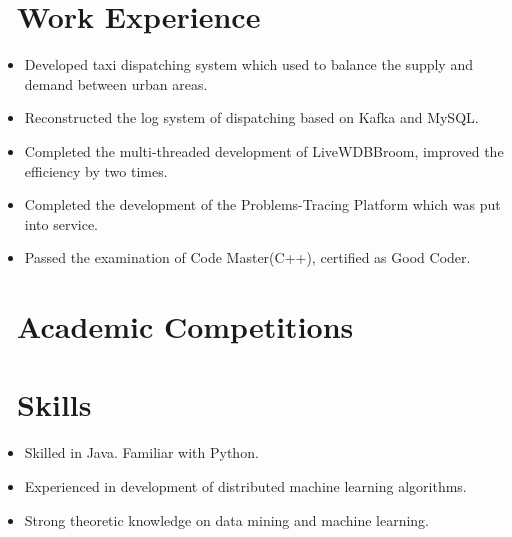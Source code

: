 \documentclass{resume}
\begin{document}
\section{\faSitemap\ Work Experience}

\begin{itemize}
  \item Developed taxi dispatching system which used to balance the supply and demand between urban areas.
  \item Reconstructed the log system of dispatching based on Kafka and MySQL.
\end{itemize}

\begin{itemize}
  \item Completed the multi-threaded development of LiveWDBBroom, improved the efficiency by two times.
  \item Completed the development of the Problems-Tracing Platform which was put into service.
  \item Passed the examination of Code Master(C++), certified as Good Coder.
\end{itemize}

\section{\faTrophy\ Academic Competitions}

\section{\faCogs\ Skills}
\begin{itemize}[parsep=0.5ex]
  \item Skilled in Java. Familiar with Python.
  \item Experienced in development of distributed machine learning algorithms.
  \item Strong theoretic knowledge on data mining and machine learning.
\end{itemize}
\end{document}
